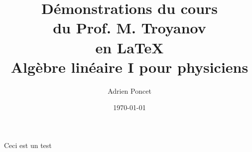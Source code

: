 \documentclass[11pt]{article}
\begin{document}
\title{Démonstrations du cours \\du Prof. M. Troyanov \\en \LaTeX 
\\Algèbre linéaire I pour physiciens}
\author{Adrien Poncet}
\date{\today}
\maketitle
\pagebreak 


Ceci est un test
\end{document}
